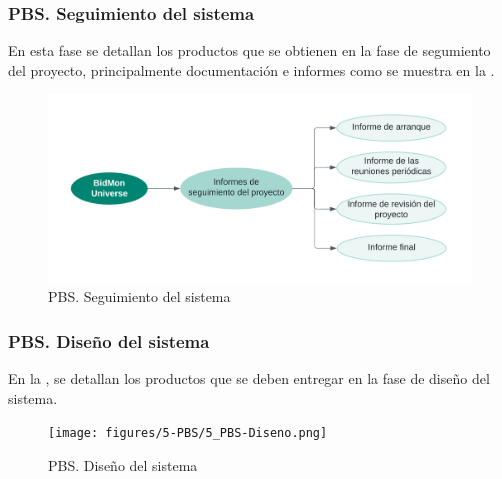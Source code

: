 \subsubsection{PBS. Seguimiento del sistema}
En esta fase se detallan los productos que se obtienen en la fase de segumiento del proyecto, principalmente documentación e informes como se muestra en la .
\begin{figure}[H]
    \hypertarget{fig:5_PBS-Seguimiento-Sistema}{}
    \centering
    \includegraphics[width=0.7\linewidth]{figures/5-PBS/5_PBS-Seguimiento.png}
    \caption{PBS. Seguimiento del sistema}
    \label{fig:5_PBS-Seguimiento-Sistema}
\end{figure}

\subsubsection{PBS. Diseño del sistema}
En la , se detallan los productos que se deben entregar en la fase de diseño del sistema.
\begin{figure}[H]
    \hypertarget{fig:5_PBS-Diseño-Sistema}{}
    \centering
    \texttt{[image: figures/5-PBS/5\_PBS-Diseno.png]}
    \caption{PBS. Diseño del sistema}
    \label{fig:5_PBS-Diseño-Sistema}
\end{figure}

